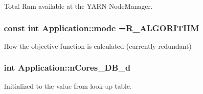 Total Ram available at the Y\-A\-R\-N Node\-Manager. 

\hypertarget{classApplication_a351cf2c8500b5b5520aeeac8f53c7f74}{
\subsubsection[{mode}]{\setlength{\rightskip}{0pt plus 5cm}const int Application\-::mode ={\bf R\-\_\-\-A\-L\-G\-O\-R\-I\-T\-H\-M}\hspace{0.3cm}{\ttfamily [private]}}}\label{classApplication_a351cf2c8500b5b5520aeeac8f53c7f74}


How the objective function is calculated (currently redundant) 

\hypertarget{classApplication_a95104d330c9c7ed2c1017b4938a39a9a}{
\subsubsection[{n\-Cores\-\_\-\-D\-B\-\_\-d}]{\setlength{\rightskip}{0pt plus 5cm}int Application\-::n\-Cores\-\_\-\-D\-B\-\_\-d\hspace{0.3cm}{\ttfamily [private]}}}\label{classApplication_a95104d330c9c7ed2c1017b4938a39a9a}


Initialized to the value from look-\/up table. 

